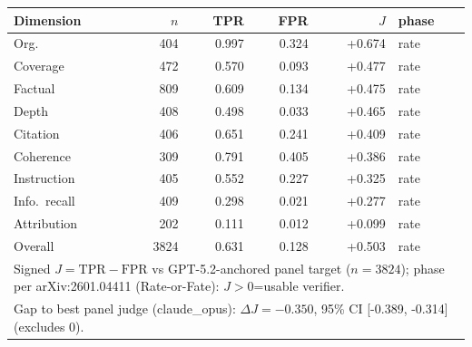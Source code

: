 \begin{tabular}{lrrrrl}
\toprule
Dimension & $n$ & TPR & FPR & $J$ & phase\\
\midrule
Org. & 404 & 0.997 & 0.324 & +0.674 & rate \\
Coverage & 472 & 0.570 & 0.093 & +0.477 & rate \\
Factual & 809 & 0.609 & 0.134 & +0.475 & rate \\
Depth & 408 & 0.498 & 0.033 & +0.465 & rate \\
Citation & 406 & 0.651 & 0.241 & +0.409 & rate \\
Coherence & 309 & 0.791 & 0.405 & +0.386 & rate \\
Instruction & 405 & 0.552 & 0.227 & +0.325 & rate \\
Info.\ recall & 409 & 0.298 & 0.021 & +0.277 & rate \\
Attribution & 202 & 0.111 & 0.012 & +0.099 & rate \\
\midrule
Overall & 3824 & 0.631 & 0.128 & +0.503 & rate \\
\midrule
\multicolumn{6}{l}{\footnotesize Signed $J=\mathrm{TPR}-\mathrm{FPR}$ vs GPT-5.2-anchored panel target ($n=3824$); phase per arXiv:2601.04411 (Rate-or-Fate): $J>0$=usable verifier.} \\
\multicolumn{6}{l}{\footnotesize Gap to best panel judge (claude_opus): $\Delta J=-0.350$, 95\% CI [-0.389, -0.314] (excludes 0).} \\
\bottomrule
\end{tabular}